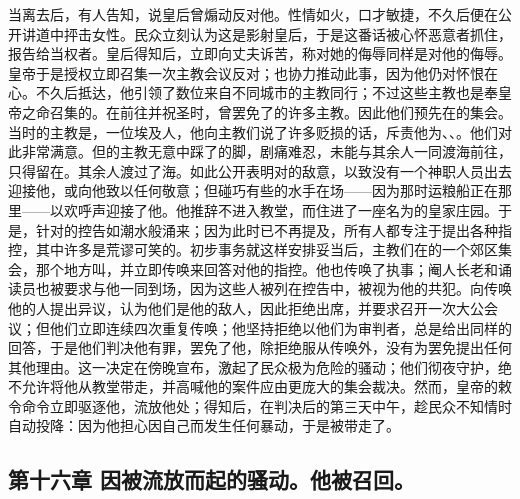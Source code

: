 当离去后，有人告知，说皇后曾煽动反对他。性情如火，口才敏捷，不久后便在公开讲道中抨击女性。民众立刻认为这是影射皇后，于是这番话被心怀恶意者抓住，报告给当权者。皇后得知后，立即向丈夫诉苦，称对她的侮辱同样是对他的侮辱。皇帝于是授权立即召集一次主教会议反对；也协力推动此事，因为他仍对怀恨在心。不久后抵达，他引领了数位来自不同城市的主教同行；不过这些主教也是奉皇帝之命召集的。在前往并祝圣时，曾罢免了的许多主教。因此他们预先在的集会。当时的主教是，一位埃及人，他向主教们说了许多贬损的话，斥责他为、、。他们对此非常满意。但的主教无意中踩了的脚，剧痛难忍，未能与其余人一同渡海前往，只得留在。其余人渡过了海。如此公开表明对的敌意，以致没有一个神职人员出去迎接他，或向他致以任何敬意；但碰巧有些的水手在场——因为那时运粮船正在那里——以欢呼声迎接了他。他推辞不进入教堂，而住进了一座名为的皇家庄园。于是，针对的控告如潮水般涌来；因为此时已不再提及，所有人都专注于提出各种指控，其中许多是荒谬可笑的。初步事务就这样安排妥当后，主教们在的一个郊区集会，那个地方叫，并立即传唤来回答对他的指控。他也传唤了执事；阉人长老和诵读员也被要求与他一同到场，因为这些人被列在控告中，被视为他的共犯。向传唤他的人提出异议，认为他们是他的敌人，因此拒绝出席，并要求召开一次大公会议；但他们立即连续四次重复传唤；他坚持拒绝以他们为审判者，总是给出同样的回答，于是他们判决他有罪，罢免了他，除拒绝服从传唤外，没有为罢免提出任何其他理由。这一决定在傍晚宣布，激起了民众极为危险的骚动；他们彻夜守护，绝不允许将他从教堂带走，并高喊他的案件应由更庞大的集会裁决。然而，皇帝的敕令命令立即驱逐他，流放他处；得知后，在判决后的第三天中午，趁民众不知情时自动投降：因为他担心因自己而发生任何暴动，于是被带走了。\par


\subsection{第十六章 因被流放而起的骚动。他被召回。}

